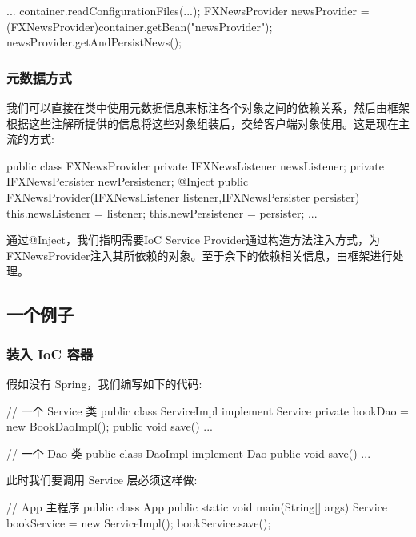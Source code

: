\begin{Java}
... 
container.readConfigurationFiles(...); 
FXNewsProvider newsProvider = (FXNewsProvider)container.getBean("newsProvider"); 
newsProvider.getAndPersistNews(); 
\end{Java}

\subsubsection{元数据方式}

我们可以直接在类中使用元数据信息来标注各个对象之间的依赖关系，然后由框架根据这些注解所提供的信息将这些对象组装后，交给客户端对象使用。这是现在主流的方式:

\begin{Java}
public class FXNewsProvider { 
    private IFXNewsListener  newsListener;
    private IFXNewsPersister newPersistener;
    @Inject
    public FXNewsProvider(IFXNewsListener listener,IFXNewsPersister persister) {
        this.newsListener   = listener;
        this.newPersistener = persister;
    }    
    ...  
} 
\end{Java}

通过@Inject，我们指明需要IoC Service Provider通过构造方法注入方式，为FXNewsProvider注入其所依赖的对象。至于余下的依赖相关信息，由框架进行处理。

\subsection{一个例子}

\subsubsection{装入 IoC 容器}

假如没有 Spring，我们编写如下的代码:

\begin{Java}
// 一个 Service 类
public class ServiceImpl implement Service {
    private bookDao = new BookDaoImpl();
    public void save() { ... }
}

// 一个 Dao 类
public class DaoImpl implement Dao {
    public void save() { ... }
}
\end{Java}


此时我们要调用 Service 层必须这样做:

\begin{Java}
// App 主程序
public class App {
    public static void main(String[] args) {
        Service bookService = new ServiceImpl();
        bookService.save();
    }
}
\end{Java}

